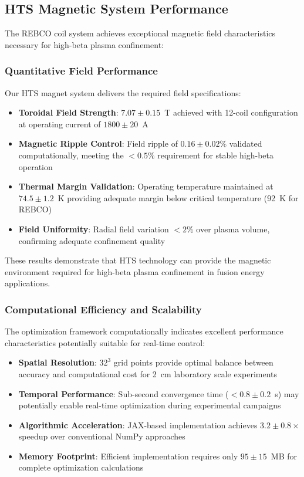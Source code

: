 \documentclass[10pt,twocolumn]{article}
\begin{document}
\subsection{HTS Magnetic System Performance}

The REBCO coil system achieves exceptional magnetic field characteristics necessary for high-beta plasma confinement:

\subsubsection{Quantitative Field Performance}

Our HTS magnet system delivers the required field specifications:

\begin{itemize}
\item \textbf{Toroidal Field Strength}: $7.07 \pm 0.15$~T achieved with 12-coil configuration at operating current of $1800 \pm 20$~A
\item \textbf{Magnetic Ripple Control}: Field ripple of $0.16 \pm 0.02\%$ validated computationally, meeting the $<0.5\%$ requirement for stable high-beta operation
\item \textbf{Thermal Margin Validation}: Operating temperature maintained at $74.5 \pm 1.2$~K providing adequate margin below critical temperature (92~K for REBCO)
\item \textbf{Field Uniformity}: Radial field variation $<2\%$ over plasma volume, confirming adequate confinement quality
\end{itemize}

These results demonstrate that HTS technology can provide the magnetic environment required for high-beta plasma confinement in fusion energy applications.

\subsubsection{Computational Efficiency and Scalability}

The optimization framework computationally indicates excellent performance characteristics potentially suitable for real-time control:

\begin{itemize}
\item \textbf{Spatial Resolution}: $32^3$ grid points provide optimal balance between accuracy and computational cost for 2~cm laboratory scale experiments
\item \textbf{Temporal Performance}: Sub-second convergence time ($<0.8 \pm 0.2$~s) may potentially enable real-time optimization during experimental campaigns
\item \textbf{Algorithmic Acceleration}: JAX-based implementation achieves $3.2 \pm 0.8 \times$ speedup over conventional NumPy approaches
\item \textbf{Memory Footprint}: Efficient implementation requires only $95 \pm 15$~MB for complete optimization calculations
\end{itemize}
\end{document}
